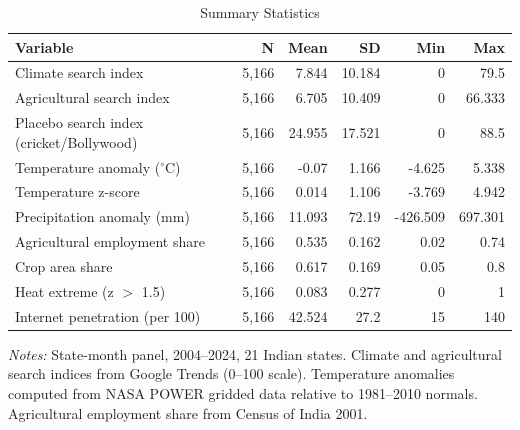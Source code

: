 \begin{table}[htbp]
\centering
\caption{Summary Statistics}
\label{tab:sumstats}
\begin{threeparttable}
\begin{tabular}{lrrrrr}
\toprule
Variable & N & Mean & SD & Min & Max \\
\midrule
Climate search index & 5,166 & 7.844 & 10.184 & 0 & 79.5 \\
Agricultural search index & 5,166 & 6.705 & 10.409 & 0 & 66.333 \\
Placebo search index (cricket/Bollywood) & 5,166 & 24.955 & 17.521 & 0 & 88.5 \\
Temperature anomaly ($^\circ$C) & 5,166 & -0.07 & 1.166 & -4.625 & 5.338 \\
Temperature z-score & 5,166 & 0.014 & 1.106 & -3.769 & 4.942 \\
Precipitation anomaly (mm) & 5,166 & 11.093 & 72.19 & -426.509 & 697.301 \\
Agricultural employment share & 5,166 & 0.535 & 0.162 & 0.02 & 0.74 \\
Crop area share & 5,166 & 0.617 & 0.169 & 0.05 & 0.8 \\
Heat extreme (z $>$ 1.5) & 5,166 & 0.083 & 0.277 & 0 & 1 \\
Internet penetration (per 100) & 5,166 & 42.524 & 27.2 & 15 & 140 \\
\bottomrule
\end{tabular}
\begin{tablenotes}[flushleft]
\small
\item \textit{Notes:} State-month panel, 2004--2024, 21 Indian states. Climate and agricultural search indices from Google Trends (0--100 scale). Temperature anomalies computed from NASA POWER gridded data relative to 1981--2010 normals. Agricultural employment share from Census of India 2001.
\end{tablenotes}
\end{threeparttable}
\end{table}
